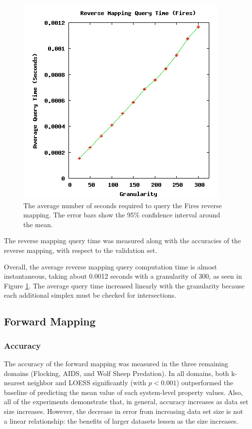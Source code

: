 \begin{figure}[ht]
\centering
\includegraphics[scale=.5]{images/results_fires/rmquery.png}
\caption{The average number of seconds required to query the Fires reverse mapping.
The error bars show the 95\% confidence interval around the mean.}
\label{fig:rmquery}
\end{figure}

The reverse mapping query time was measured along with the accuracies of the reverse mapping, with respect to the validation set.

Overall, the average reverse mapping query computation time is almost instantaneous, taking about 0.0012 seconds with a granularity of 300, as seen in Figure \ref{fig:rmquery}.
The average query time increased linearly with the granularity because each additional simplex must be checked for intersections.


 \subsection{Forward Mapping}

  \subsubsection{Accuracy}

The accuracy of the forward mapping was measured in the three remaining domains (Flocking, AIDS, and Wolf Sheep Predation).
In all domains, both k-nearest neighbor and LOESS significantly (with $p < 0.001$) outperformed the baseline of predicting the mean value of each system-level property values.
Also, all of the experiments demonstrate that, in general, accuracy increases as data set size increases.
However, the decrease in error from increasing data set size is not a linear relationship: the benefits of larger datasets lessen as the size increases.

